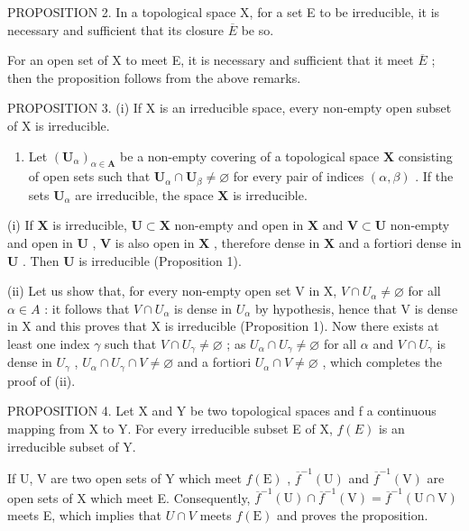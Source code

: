 PROPOSITION 2. In a topological space X, for a set E to be irreducible, it is necessary and sufficient that its closure \(\overline{E}\) be so.

For an open set of X to meet E, it is necessary and sufficient that it meet \(\overline{E}\) ; then the proposition follows from the above remarks.

PROPOSITION 3. (i) If X is an irreducible space, every non-empty open subset of X is irreducible.

\begin{enumerate}
\def\labelenumi{(\roman{enumi})}
\setcounter{enumi}{1}
\item
  Let \((\mathbf{U}_{\alpha})_{\alpha \in \mathbf{A}}\) be a non-empty covering of a topological space \(\mathbf{X}\) consisting of open sets such that \(\mathbf{U}_{\alpha} \cap \mathbf{U}_{\beta} \neq \varnothing\) for every pair of indices \((\alpha, \beta)\) . If the sets \(\mathbf{U}_{\alpha}\) are irreducible, the space \(\mathbf{X}\) is irreducible.
\end{enumerate}

(i) If \(\mathbf{X}\) is irreducible, \(\mathbf{U} \subset \mathbf{X}\) non-empty and open in \(\mathbf{X}\) and \(\mathbf{V} \subset \mathbf{U}\) non-empty and open in \(\mathbf{U}\) , \(\mathbf{V}\) is also open in \(\mathbf{X}\) , therefore dense in \(\mathbf{X}\) and a fortiori dense in \(\mathbf{U}\) . Then \(\mathbf{U}\) is irreducible (Proposition 1).

(ii) Let us show that, for every non-empty open set V in X, \(V \cap U_{\alpha} \neq \varnothing\) for all \(\alpha \in A\) : it follows that \(V \cap U_{\alpha}\) is dense in \(U_{\alpha}\) by hypothesis, hence that V is dense in X and this proves that X is irreducible (Proposition 1). Now there exists at least one index \(\gamma\) such that \(V \cap U_{\gamma} \neq \varnothing\) ; as \(U_{\alpha} \cap U_{\gamma} \neq \varnothing\) for all \(\alpha\) and \(V \cap U_{\gamma}\) is dense in \(U_{\gamma}\) , \(U_{\alpha} \cap U_{\gamma} \cap V \neq \varnothing\) and a fortiori \(U_{\alpha} \cap V \neq \varnothing\) , which completes the proof of (ii).

PROPOSITION 4. Let X and Y be two topological spaces and f a continuous mapping from X to Y. For every irreducible subset E of X, \(f(E)\) is an irreducible subset of Y.

If U, V are two open sets of Y which meet \(f(\mathrm{E})\) , \(\overline{f}^{-1}(\mathrm{U})\) and \(\overline{f}^{-1}(\mathrm{V})\) are open sets of X which meet E. Consequently, \(\overline{f}^{-1}(\mathrm{U}) \cap \overline{f}^{-1}(\mathrm{V}) = \overline{f}^{-1}(\mathrm{U} \cap \mathrm{V})\) meets E, which implies that \(U \cap V\) meets \(f(\mathrm{E})\) and proves the proposition.

